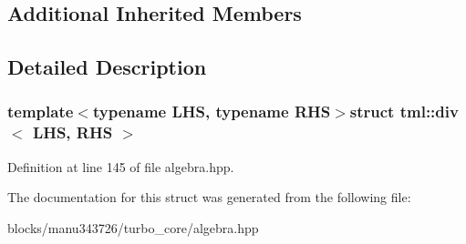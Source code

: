 \subsection*{Additional Inherited Members}


\subsection{Detailed Description}
\subsubsection*{template$<$typename L\+H\+S, typename R\+H\+S$>$struct tml\+::div$<$ L\+H\+S, R\+H\+S $>$}



Definition at line 145 of file algebra.\+hpp.



The documentation for this struct was generated from the following file\+:\begin{DoxyCompactItemize}
\item 
blocks/manu343726/turbo\+\_\+core/algebra.\+hpp\end{DoxyCompactItemize}
